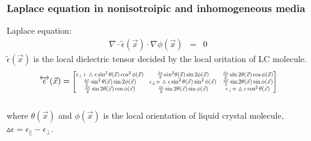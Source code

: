 \documentclass{beamer}
\newcommand\scalemath[2]{\scalebox{#1}{\mbox{\ensuremath{\displaystyle #2}}}} %
\begin{document}
\begin{frame}
\frametitle{Laplace equation in nonisotroipic and inhomogeneous media}
Laplace equation:
\begin{eqnarray}
\nabla \cdot \overleftrightarrow{\epsilon}(\vec x) \cdot \nabla \phi(\vec x) &=& 0 \nonumber
\label{eq:laplace}
\end{eqnarray}
$\overleftrightarrow{\epsilon}(\vec x)$ is the local dielectric tensor decided by the local oritation of LC molecule. 
\\
\begin{eqnarray}
\overleftrightarrow{\epsilon}(\vec x) = 
\scalemath{0.7}{
\begin{bmatrix}
\epsilon_{\perp}+\vartriangle\epsilon \sin^2\theta(\vec{x})\cos^2\phi(\vec{x}) & \frac{\vartriangle\epsilon}{2} sin^2\theta(\vec{x})\sin 2\phi(\vec{x}) & \frac{\vartriangle\epsilon}{2} \sin 2\theta(\vec{x})\cos\phi(\vec{x}) \\
\frac{\vartriangle\epsilon}{2} \sin^2\theta(\vec{x})\sin 2\phi(\vec{x}) & \epsilon_{\perp}+\vartriangle\epsilon \sin^2\theta(\vec{x})\sin^2\phi(\vec{x}) & \frac{\vartriangle\epsilon}{2} \sin 2\theta(\vec{x})\sin\phi(\vec{x}) \\
\frac{\vartriangle\epsilon}{2} \sin 2\theta(\vec{x})\cos\phi(\vec{x}) & \frac{\vartriangle\epsilon}{2} \sin 2\theta(\vec{x})\sin\phi(\vec{x}) & \epsilon_{\perp}+\vartriangle\epsilon \cos^2\theta(\vec{x})\\ 
\end{bmatrix}}
\nonumber
\label{eq:dielectric_tensor}
\end{eqnarray}
\\
where $\theta(\vec{x})$ and $\phi(\vec{x})$ is the local orientation of liquid crystal molecule, $\vartriangle\epsilon = \epsilon_{\parallel}-\epsilon_{\perp}$.
\end{frame}
\end{document}
